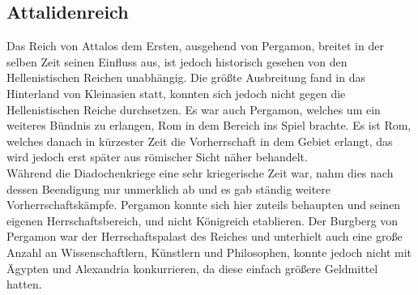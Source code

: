 \documentclass{article}
\begin{document}
	\subsection{Attalidenreich}
	Das Reich von Attalos dem Ersten, ausgehend von Pergamon, breitet in der selben Zeit seinen Einfluss aus, ist jedoch historisch gesehen von den Hellenistischen Reichen unabhängig. Die größte Ausbreitung fand in das Hinterland von Kleinasien statt, konnten sich jedoch nicht gegen die Hellenistischen Reiche durchsetzen. Es war auch Pergamon, welches um ein weiteres Bündnis zu erlangen, Rom in dem Bereich ins Spiel brachte. Es ist Rom, welches danach in kürzester Zeit die Vorherrschaft in dem Gebiet erlangt, das wird jedoch erst später aus römischer Sicht näher behandelt. \\
	Während die Diadochenkriege eine sehr kriegerische Zeit war, nahm dies nach dessen Beendigung nur unmerklich ab und es gab ständig weitere Vorherrschaftskämpfe. Pergamon konnte sich hier zuteils behaupten und seinen eigenen Herrschaftsbereich, und nicht Königreich etablieren. Der Burgberg von Pergamon war der Herrschaftspalast des Reiches und unterhielt auch eine große Anzahl an Wissenschaftlern, Künstlern und Philosophen, konnte jedoch nicht mit Ägypten und Alexandria konkurrieren, da diese einfach größere Geldmittel hatten. \\
\end{document}
